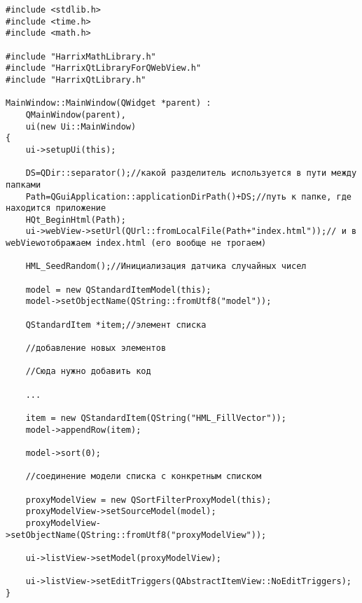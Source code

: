 \begin{itemize}
\begin{lstlisting}[label=examplefunction03, caption=mainwindow.cpp]
#include <stdlib.h>
#include <time.h>
#include <math.h>

#include "HarrixMathLibrary.h"
#include "HarrixQtLibraryForQWebView.h"
#include "HarrixQtLibrary.h"

MainWindow::MainWindow(QWidget *parent) :
    QMainWindow(parent),
    ui(new Ui::MainWindow)
{
    ui->setupUi(this);

    DS=QDir::separator();//какой разделитель используется в пути между папками
    Path=QGuiApplication::applicationDirPath()+DS;//путь к папке, где находится приложение
    HQt_BeginHtml(Path);
    ui->webView->setUrl(QUrl::fromLocalFile(Path+"index.html"));// и в webViewотображаем index.html (его вообще не трогаем)

    HML_SeedRandom();//Инициализация датчика случайных чисел

    model = new QStandardItemModel(this);
    model->setObjectName(QString::fromUtf8("model"));

    QStandardItem *item;//элемент списка

    //добавление новых элементов
    
    //Сюда нужно добавить код
	
	...
    
    item = new QStandardItem(QString("HML_FillVector"));
    model->appendRow(item);

    model->sort(0);

    //соединение модели списка с конкретным списком

    proxyModelView = new QSortFilterProxyModel(this);
    proxyModelView->setSourceModel(model);
    proxyModelView->setObjectName(QString::fromUtf8("proxyModelView"));

    ui->listView->setModel(proxyModelView);

    ui->listView->setEditTriggers(QAbstractItemView::NoEditTriggers);
}
\end{lstlisting}


\end{itemize}
